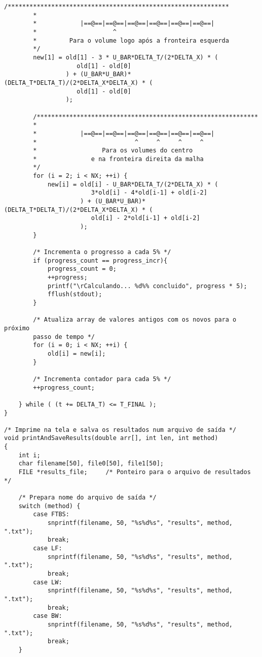 \begin{Verbatim}[fontsize=\footnotesize]
        /*************************************************************
        *
        *            |==@==|==@==|==@==|==@==|==@==|==@==|
        *                     ^
        *         Para o volume logo após a fronteira esquerda
        */
        new[1] = old[1] - 3 * U_BAR*DELTA_T/(2*DELTA_X) * (
                    old[1] - old[0]
                 ) + (U_BAR*U_BAR)*(DELTA_T*DELTA_T)/(2*DELTA_X*DELTA_X) * (
                    old[1] - old[0]
                 );

        /*************************************************************
        *
        *            |==@==|==@==|==@==|==@==|==@==|==@==|
        *                           ^     ^     ^     ^
        *                  Para os volumes do centro
        *               e na fronteira direita da malha
        */
        for (i = 2; i < NX; ++i) {
            new[i] = old[i] - U_BAR*DELTA_T/(2*DELTA_X) * (
                        3*old[i] - 4*old[i-1] + old[i-2]
                     ) + (U_BAR*U_BAR)*(DELTA_T*DELTA_T)/(2*DELTA_X*DELTA_X) * (
                        old[i] - 2*old[i-1] + old[i-2]
                     );
        }

        /* Incrementa o progresso a cada 5% */
        if (progress_count == progress_incr){
            progress_count = 0;
            ++progress;
            printf("\rCalculando... %d%% concluido", progress * 5);
            fflush(stdout);
        }

        /* Atualiza array de valores antigos com os novos para o próximo
        passo de tempo */
        for (i = 0; i < NX; ++i) {
            old[i] = new[i];
        }

        /* Incrementa contador para cada 5% */
        ++progress_count;

    } while ( (t += DELTA_T) <= T_FINAL );
}

/* Imprime na tela e salva os resultados num arquivo de saída */
void printAndSaveResults(double arr[], int len, int method)
{
    int i;
    char filename[50], file0[50], file1[50];
    FILE *results_file;     /* Ponteiro para o arquivo de resultados */

    /* Prepara nome do arquivo de saída */
    switch (method) {
        case FTBS:
            snprintf(filename, 50, "%s%d%s", "results", method, ".txt");
            break;
        case LF:
            snprintf(filename, 50, "%s%d%s", "results", method, ".txt");
            break;
        case LW:
            snprintf(filename, 50, "%s%d%s", "results", method, ".txt");
            break;
        case BW:
            snprintf(filename, 50, "%s%d%s", "results", method, ".txt");
            break;
    }


\end{Verbatim}
